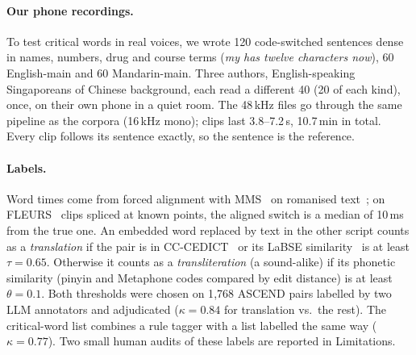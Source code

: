 \paragraph{Our phone recordings.}
To test critical words in real voices, we wrote 120 code-switched sentences dense in names, numbers, drug and course terms (\emph{my  has twelve characters now}), 60 English-main and 60 Mandarin-main. Three authors, English-speaking Singaporeans of Chinese background, each read a different 40 (20 of each kind), once, on their own phone in a quiet room. The 48\,kHz files go through the same pipeline as the corpora (16\,kHz mono); clips last 3.8--7.2\,s, 10.7\,min in total. Every clip follows its sentence exactly, so the sentence is the reference.

\paragraph{Labels.}
Word times come from forced alignment with MMS~\citep{pratap2024mms} on romanised text~\citep{hermjakob2018uroman}; on FLEURS~\citep{conneau2023fleurs} clips spliced at known points, the aligned switch is a median of 10\,ms from the true one. An embedded word replaced by text in the other script counts as a \emph{translation} if the pair is in CC-CEDICT~\citep{cccedict} or its LaBSE similarity~\citep{feng2022labse} is at least $\tau=0.65$. Otherwise it counts as a \emph{transliteration} (a sound-alike) if its phonetic similarity (pinyin and Metaphone codes compared by edit distance) is at least $\theta=0.1$. Both thresholds were chosen on 1{,}768 ASCEND pairs labelled by two LLM annotators and adjudicated ($\kappa=0.84$ for translation vs.\ the rest). The critical-word list combines a rule tagger with a list labelled the same way ($\kappa=0.77$). Two small human audits of these labels are reported in Limitations.
